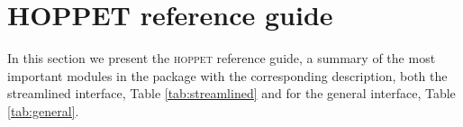 \documentclass[12pt]{article}
\newcommand{\hoppet}{\textsc{hoppet}\xspace}
\newcommand{\ttt}[1]{\texttt{#1}}
\begin{document}






\section{HOPPET reference guide}
\label{sec:refguide}

In this section we present the \hoppet reference guide, a 
summary of the most important modules in the package with
the corresponding description, both the streamlined interface,
Table \ref{tab:streamlined} and for the general interface,
Table  \ref{tab:general}.
\end{document}
